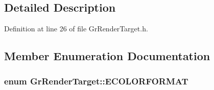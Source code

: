 \begin{CompactItemize}
\subsection{Detailed Description}


Definition at line 26 of file GrRenderTarget.h.

\subsection{Member Enumeration Documentation}
\hypertarget{class_gr_render_target_c5acf92ad0c41edbb66e9fc4b8a559a2}{
\subsubsection[{ECOLORFORMAT}]{\setlength{\rightskip}{0pt plus 5cm}enum {\bf GrRenderTarget::ECOLORFORMAT}}}
\label{class_gr_render_target_c5acf92ad0c41edbb66e9fc4b8a559a2}



\end{CompactItemize}

